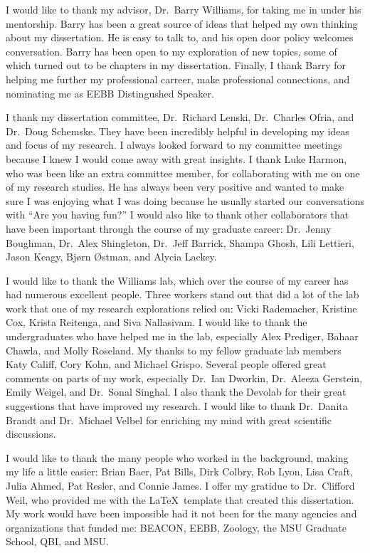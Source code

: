 \begin{acknowledgment}

I would like to thank my advisor, Dr.\ Barry Williams,
for taking me in under his mentorship.
%
Barry has been a great source of ideas
that helped my own thinking about my dissertation.
%
He is easy to talk to,
and his open door policy welcomes conversation.
%
Barry has been open to my exploration of new topics,
some of which turned out to be chapters in my dissertation.
%
Finally, I thank Barry for helping me further my professional carreer,
make professional connections, and nominating me as EEBB Distingushed Speaker.



I thank my dissertation committee,
Dr.\ Richard Lenski, Dr.\ Charles Ofria, and Dr.\ Doug Schemske.
%
They have been incredibly helpful
in developing my ideas and focus of my research.
%
I always looked forward to my committee meetings
because I knew I would come away with great insights.
%
I thank Luke Harmon, who was been like an extra committee member,
for collaborating with me on one of my research studies.
%
He has always been very positive and wanted to make sure
I was enjoying what I was doing because he usually started
our conversations with ``Are you having fun?''
%
I would also like to thank other collaborators that have
been important through the course of my graduate career:
Dr.\ Jenny Boughman, Dr.\ Alex Shingleton, Dr.\ Jeff Barrick,
Shampa Ghosh, Lili Lettieri, Jason Keagy, Bj\o rn \O stman, and Alycia Lackey.



I would like to thank the Williams lab,
which over the course of my career has had numerous excellent people.
%
Three workers stand out that did a lot of the lab work
that one of my research explorations relied on:
Vicki Rademacher, Kristine Cox, Krista Reitenga, and Siva Nallasivam.
%
I would like to thank the undergraduates who have helped me in the lab,
especially Alex Prediger, Bahaar Chawla, and Molly Roseland.
%
My thanks to my fellow graduate lab members
Katy Califf, Cory Kohn, and Michael Grispo.
%
Several people offered great comments on parts of my work, especially
Dr.\ Ian Dworkin, Dr.\ Aleeza Gerstein, Emily Weigel, and Dr.\ Sonal Singhal.
%
I also thank the Devolab for their great suggestions
that have improved my research.
%
I would like to thank Dr.\ Danita Brandt and Dr.\ Michael Velbel
for enriching my mind with great scientific discussions.



I would like to thank the many people who worked in the background,
making my life a little easier:
Brian Baer, Pat Bills, Dirk Colbry, Rob Lyon, Lisa Craft, Julia Ahmed,
Pat Resler, and Connie James.
%
I offer my gratidue to Dr.\ Clifford Weil, who provided me
with the \LaTeX\ template that created this dissertation.
%
My work would have been impossible had it not been
for the many agencies and organizations that funded me:
BEACON, EEBB, Zoology, the MSU Graduate School, QBI, and MSU.




\end{acknowledgment}
